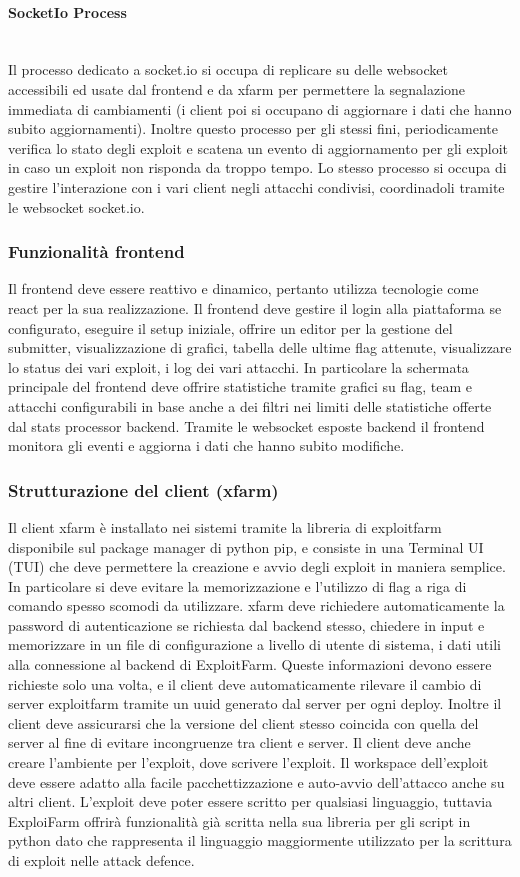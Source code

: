 \documentclass[11pt]{article}
\begin{document}
\paragraph{SocketIo Process}\mbox{}\\
Il processo dedicato a socket.io si occupa di replicare su delle websocket accessibili ed usate dal frontend e da xfarm per permettere la segnalazione immediata di cambiamenti (i client poi si occupano di aggiornare i dati che hanno subito aggiornamenti).
Inoltre questo processo per gli stessi fini, periodicamente verifica lo stato degli exploit e scatena un evento di aggiornamento per gli exploit in caso un exploit non risponda da troppo tempo. Lo stesso processo si occupa di gestire l'interazione con i vari client negli attacchi condivisi, coordinadoli tramite le websocket socket.io.
\subsubsection{Funzionalità frontend}
Il frontend deve essere reattivo e dinamico, pertanto utilizza tecnologie come react per la sua realizzazione. Il frontend deve gestire il login alla piattaforma se configurato, eseguire il setup iniziale, offrire un editor per la gestione del submitter, visualizzazione di grafici, tabella delle ultime flag attenute, visualizzare lo status dei vari exploit, i log dei vari attacchi.
In particolare la schermata principale del frontend deve offrire statistiche tramite grafici su flag, team e attacchi configurabili in base anche a dei filtri nei limiti delle statistiche offerte dal stats processor backend.
Tramite le websocket esposte backend il frontend monitora gli eventi e aggiorna i dati che hanno subito modifiche.
\subsubsection{Strutturazione del client (xfarm)}
Il client xfarm è installato nei sistemi tramite la libreria di exploitfarm disponibile sul package manager di python pip, e consiste in una Terminal UI (TUI) che deve permettere la creazione e avvio degli exploit in maniera semplice. In particolare si deve evitare la memorizzazione e l'utilizzo di flag a riga di comando spesso scomodi da utilizzare. xfarm deve richiedere automaticamente la password di autenticazione se richiesta dal backend stesso, chiedere in input e memorizzare in un file di configurazione a livello di utente di sistema, i dati utili alla connessione al backend di ExploitFarm. Queste informazioni devono essere richieste solo una volta, e il client deve automaticamente rilevare il cambio di server exploitfarm tramite un uuid generato dal server per ogni deploy. Inoltre il client deve assicurarsi che la versione del client stesso coincida con quella del server al fine di evitare incongruenze tra client e server. Il client deve anche creare l'ambiente per l'exploit, dove scrivere l'exploit. Il workspace dell'exploit deve essere adatto alla facile pacchettizzazione e auto-avvio dell'attacco anche su altri client. L'exploit deve poter essere scritto per qualsiasi linguaggio, tuttavia ExploiFarm offrirà funzionalità già scritta nella sua libreria per gli script in python dato che rappresenta il linguaggio maggiormente utilizzato per la scrittura di exploit nelle attack defence.
\end{document}
